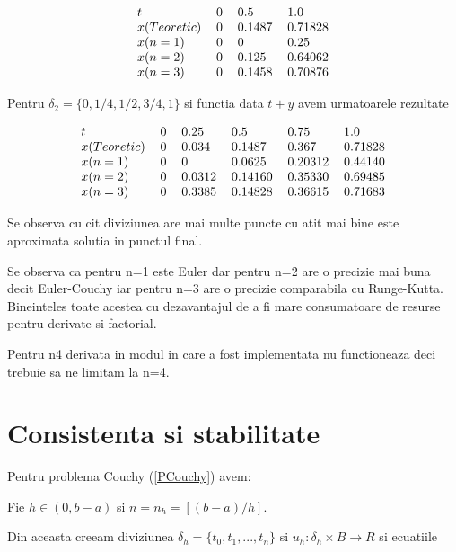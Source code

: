 \documentclass[a4paper,twoside]{book}
\begin{document}
\begin{equation*}
\begin{tabular}{llll}
$t$ & 0 & 0.5 & 1.0 \\ 
$x(Teoretic)$ & 0 & 0.1487 & 0.71828 \\ 
$x(n=1)$ & 0 & 0 & 0.25 \\ 
$x(n=2)$ & 0 & 0.125 & 0.64062 \\ 
$x(n=3)$ & 0 & 0.1458 & 0.70876%
\end{tabular}%
\end{equation*}

Pentru $\delta _{2}=\{0,1/4,1/2,3/4,1\}$ si functia data $t+y$ avem
urmatoarele rezultate

\begin{equation*}
\begin{tabular}{llllll}
$t$ & 0 & 0.25 & 0.5 & 0.75 & 1.0 \\ 
$x(Teoretic)$ & 0 & 0.034 & 0.1487 & 0.367 & 0.71828 \\ 
$x(n=1)$ & 0 & 0 & 0.0625 & 0.20312 & 0.44140 \\ 
$x(n=2)$ & 0 & 0.0312 & 0.14160 & 0.35330 & 0.69485 \\ 
$x(n=3)$ & 0 & 0.3385 & 0.14828 & 0.36615 & 0.71683%
\end{tabular}%
\end{equation*}

Se observa cu cit diviziunea are mai multe puncte cu atit mai bine este
aproximata solutia in punctul final.

Se observa ca pentru n=1 este Euler dar pentru n=2 are o precizie mai buna
decit Euler-Couchy iar pentru n=3 are o precizie comparabila cu Runge-Kutta.
Bineinteles toate acestea cu dezavantajul de a fi mare consumatoare de
resurse pentru derivate si factorial.

Pentru n\TEXTsymbol{>}4 derivata in modul in care a fost implementata nu
functioneaza deci trebuie sa ne limitam la n=4.

\section{Consistenta si stabilitate}

\bigskip Pentru problema Couchy (\ref{PCouchy}) avem:

Fie $h\in (0,b-a)$ si $n=n_{h}=[(b-a)/h]$.

Din aceasta creeam diviziunea $\delta _{h}=\{t_{0},t_{1},...,t_{n}\}$ si $%
u_{h}:\delta _{h}\times B\rightarrow R$ si ecuatiile
\end{document}
